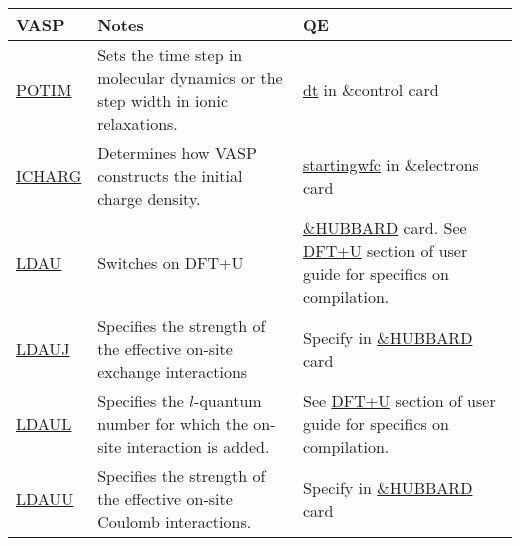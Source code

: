 \documentclass[12pt]{article}
\begin{document}
\newpage
\begin{center}
\begin{table}[ht]
\begin{tabularx}{\linewidth}{|>{\RaggedRight}p{2.5cm}|x|x|}\hline
 VASP  & Notes & QE \\ \hline
 
 \href{https://www.vasp.at/wiki/index.php/POTIM}{POTIM} &
 Sets the time step in molecular dynamics or the step width in ionic relaxations. &
 \href{https://www.quantum-espresso.org/Doc/INPUT_PW.html#idm36}{dt} in \&control card \\ \hline
  
 \href{https://www.vasp.at/wiki/index.php/ICHARG}{ICHARG} &
 Determines how VASP constructs the initial charge density. &
 \href{https://www.quantum-espresso.org/Doc/INPUT_PW.html#idm764}{startingwfc} in \&electrons card \\ \hline

 \href{https://www.vasp.at/wiki/index.php/LDAU}{LDAU} &
 Switches on DFT+U &
 \href{https://www.quantum-espresso.org/Doc/INPUT_PW.html#idm1699}{\&HUBBARD} card. See \href{https://www.quantum-espresso.org/wp-content/uploads/2022/03/pw_user_guide.pdf}{DFT+U} section of user guide for specifics on compilation. \\ \hline
 
 \href{https://www.vasp.at/wiki/index.php/LDAUJ}{LDAUJ} &
 Specifies the strength of the effective on-site exchange interactions &
 Specify in \href{https://www.quantum-espresso.org/Doc/INPUT_PW.html#idm1699}{\&HUBBARD} card  \\ \hline
 
 \href{https://www.vasp.at/wiki/index.php/LDAUL}{LDAUL} &
 Specifies the $l$-quantum number for which the on-site interaction is added. &
 See \href{https://www.quantum-espresso.org/wp-content/uploads/2022/03/pw_user_guide.pdf}{DFT+U} section of user guide for specifics on compilation. \\ \hline
 
 \href{https://www.vasp.at/wiki/index.php/LDAUU}{LDAUU} &
 Specifies the strength of the effective on-site Coulomb interactions. &
 Specify in \href{https://www.quantum-espresso.org/Doc/INPUT_PW.html#idm1699}{\&HUBBARD} card \\ \hline
 

\end{tabularx}
\end{table}
\end{center}
\end{document}
